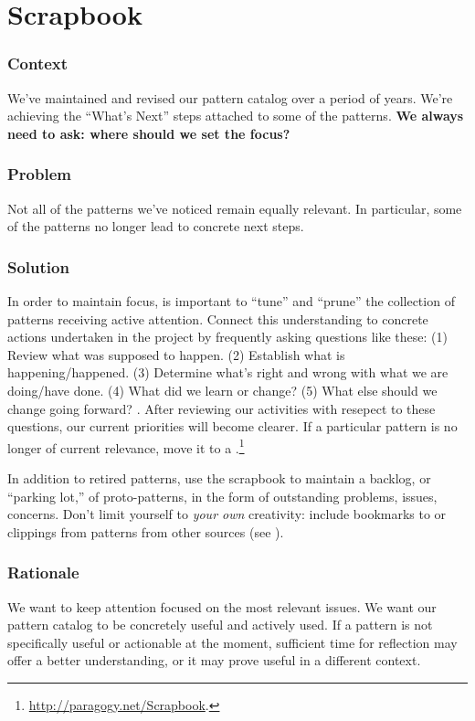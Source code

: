 \section{Scrapbook} \label{sec:Scrapbook}

\subsubsection*{Context} We've maintained and revised our pattern catalog over a period of years.  We're achieving
the ``What's Next'' steps attached to some of the patterns.
\textbf{We always need to ask: where should we set the focus?}

\subsubsection*{Problem} Not all of the patterns we've noticed remain equally relevant.  In particular, some of the patterns no longer lead to concrete next steps.

\subsubsection*{Solution} In order to maintain focus, is important to ``tune'' and ``prune'' the collection of patterns receiving active attention.  Connect this understanding to concrete actions undertaken in the project by frequently asking questions like these:
(1) Review what was supposed to happen.
(2) Establish what is happening/happened.
(3) Determine what’s right and wrong with what we are doing/have done.
(4) What did we learn or change? 
(5) What else should we change going forward?  \cite[Chapter 28]{peeragogy-handbook}.
%
After reviewing our activities with resepect to these questions, our
current priorities will become clearer.  If a particular pattern is no
longer of current relevance, move it to a
.\footnote{\url{http://paragogy.net/Scrapbook}.}  

In addition to retired patterns, use the scrapbook to maintain a
backlog, or ``parking lot,'' of proto-patterns, in the form of
outstanding problems, issues, concerns.  Don't limit yourself to
\emph{your own} creativity: include bookmarks to or clippings from
patterns from other sources (see ).

\subsubsection*{Rationale} We want to keep attention focused on the most relevant issues.
We want our pattern catalog to be concretely useful and actively used.
If a pattern is not specifically useful or actionable at the
moment, sufficient time for reflection may offer a better
understanding, or it may prove useful in a different context.


